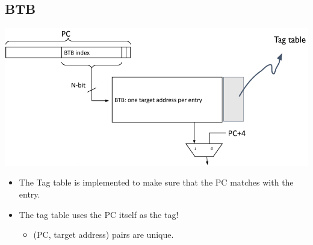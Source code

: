 \documentclass[10pt]{article}
\begin{document}
\subsection*{BTB}
\begin{center}
    \includegraphics[scale=0.7]{W4_3.png}
\end{center}
\begin{itemize}
    \item The Tag table is implemented to make sure that the PC matches with the entry.
    \item The tag table uses the PC itself as the tag!
    \begin{itemize}
        \item (PC, target address) pairs are unique.
    \end{itemize}
\end{itemize}
\end{document}

